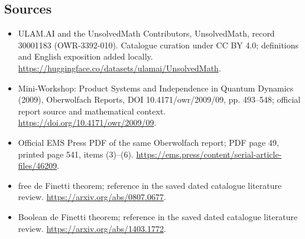 \documentclass[11pt]{article}
\begin{document}
\subsection{Sources}
\begin{itemize}
\item[\hypertarget{source:30001183:1}{S1}] ULAM.AI and the UnsolvedMath Contributors, UnsolvedMath, record 30001183 (OWR-3392-010). Catalogue curation under CC BY 4.0; definitions and English exposition added locally.
\url{https://huggingface.co/datasets/ulamai/UnsolvedMath}.
\item[\hypertarget{source:30001183:2}{S2}] Mini-Workshop: Product Systems and Independence in Quantum Dynamics (2009), Oberwolfach Reports, DOI 10.4171/owr/2009/09, pp. 493--548; official report source and mathematical context.
\url{https://doi.org/10.4171/owr/2009/09}.
\item[\hypertarget{source:30001183:3}{S3}] Official EMS Press PDF of the same Oberwolfach report; PDF page 49, printed page 541, items (3)--(6).
\url{https://ems.press/content/serial-article-files/46209}.
\item[\hypertarget{source:30001183:4}{S4}] free de Finetti theorem; reference in the saved dated catalogue literature review.
\url{https://arxiv.org/abs/0807.0677}.
\item[\hypertarget{source:30001183:5}{S5}] Boolean de Finetti theorem; reference in the saved dated catalogue literature review.
\url{https://arxiv.org/abs/1403.1772}.
\end{itemize}
\label{end:30001183}
\end{document}
